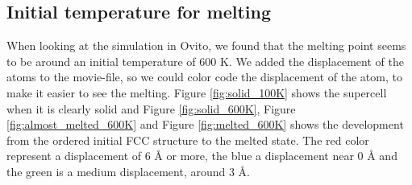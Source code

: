 \subsection{Initial temperature for melting}

When looking at the simulation in Ovito, we found that the melting point seems to be around an initial temperature of 600 K. We added the displacement of the atoms to the movie-file, so we could color code the displacement of the atom, to make it easier to see the melting. Figure \ref{fig:solid_100K} shows the supercell when it is clearly solid and Figure \ref{fig:solid_600K}, Figure \ref{fig:almost_melted_600K} and Figure \ref{fig:melted_600K} shows the development from the ordered initial FCC structure to the melted state. The red color represent a displacement of 6 Å or more, the blue a displacement near 0 Å and the green is a medium displacement, around 3 Å. 

